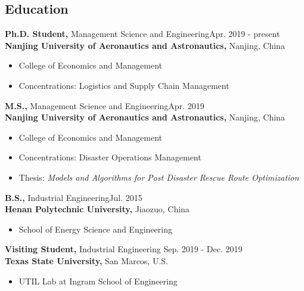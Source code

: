 \documentclass[margin]{res}
\begin{document}
 

\address{
Nanjing University of Aeronautics and Astronautics \\
29 Jiangjun Avenue, Nanjing \\
Jiangsu, China 211106}
\address{
Email: guopenghui@outlook.com \\
Homepage: https://guo.ph}

\begin{resume} 


\section{\sc Education}
{\bf Ph.D. Student,}  Management Science and Engineering\hfill Apr. 2019 - present \\
{\bf Nanjing University of Aeronautics and Astronautics,} Nanjing, China
\begin{itemize}  \itemsep -2pt  %
\item College of Economics and Management
\item Concentrations: Logistics and Supply Chain Management
\end{itemize}

{\bf M.S.,}  Management Science and Engineering\hfill Apr. 2019 \\
{\bf Nanjing University of Aeronautics and Astronautics,} Nanjing, China
\begin{itemize}  \itemsep -2pt  %
\item College of Economics and Management
\item Concentrations: Disaster Operations Management
\item Thesis: {\it Models and Algorithms for Post Disaster Rescue Route Optimization}
\end{itemize}

{\bf B.S.,}  Industrial Engineering\hfill Jul. 2015 \\
{\bf Henan Polytechnic University,} Jiaozuo, China
\begin{itemize}
\item School of Energy Science and Engineering
\end{itemize}

{\bf Visiting Student,} Industrial Engineering \hfill Sep. 2019 - Dec. 2019\\
{\bf Texas State University,} San Marcos, U.S.
\begin{itemize}
\item UTIL Lab at Ingram School of Engineering
\end{itemize}



\end{resume}
\end{document}
